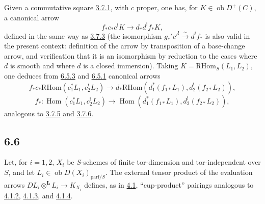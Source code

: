 \documentclass[11pt]{article}
\DeclareMathOperator{\Hom}{Hom}
\providecommand{\RHom}{\mathrm{RHom}}
\providecommand{\RHom}{\mathrm{RHom}}
\providecommand{\Hom}{\operatorname{Hom}}
\providecommand{\RHom}{\mathrm R\mathcal{H}om}
\providecommand{\RHom}{\mathrm{RHom}}
\providecommand{\Hom}{\operatorname{Hom}}
\begin{document}
Given a commutative square \hyperref[sga5:III:equation:3.7.1]{3.7.1}, with $c$ proper, one has, for $K\in\operatorname{ob}D^+(C)$, a canonical arrow
\begin{equation}
\tag{6.5.3}\label{sga5:III:equation:6.5.3}
f_*c_*c^!K\longrightarrow d_*d^!f_*K,
\end{equation}
defined in the same way as \hyperref[sga5:III:equation:3.7.3]{3.7.3} (the isomorphism $g_*'c'^!\xrightarrow{\sim}d^!f_*$ is also valid in the present context: definition of the arrow by transposition of a base-change arrow, and verification that it is an isomorphism by reduction to the cases where $d$ is smooth and where $d$ is a closed immersion). Taking $K=\RHom_S(L_1,L_2)$, one deduces from \hyperref[sga5:III:equation:6.5.3]{6.5.3} and \hyperref[sga5:III:equation:6.5.1]{6.5.1} canonical arrows
\begin{equation}
\tag{6.5.4}\label{sga5:III:equation:6.5.4}
f_*c_*\RHom(c_1^*L_1,c_2^!L_2)\longrightarrow d_*\RHom(d_1^*(f_{1*}L_1),d_2^!(f_{2*}L_2)),
\end{equation}
\begin{equation}
\tag{6.5.5}\label{sga5:III:equation:6.5.5}
f_*:\Hom(c_1^*L_1,c_2^!L_2)\longrightarrow\Hom(d_1^*(f_{1*}L_1),d_2^!(f_{2*}L_2)),
\end{equation}
analogous to \hyperref[sga5:III:equation:3.7.5]{3.7.5} and \hyperref[sga5:III:equation:3.7.6]{3.7.6}.

\subsection*{6.6}\label{sga5:III:subsection:6.6}
Let, for $i=1,2$, $X_i$ be $S$-schemes of finite tor-dimension and tor-independent over $S$, and let $L_i\in\operatorname{ob}D(X_i)_{\mathrm{parf}/S}$. The external tensor product of the evaluation arrows $DL_i\otimes^{\mathbf L}L_i\to K_{X_i}$ defines, as in \hyperref[sga5:III:subsection:4.1]{4.1}, ``cup-product'' pairings analogous to \hyperref[sga5:III:equation:4.1.2]{4.1.2}, \hyperref[sga5:III:equation:4.1.3]{4.1.3}, and \hyperref[sga5:III:equation:4.1.4]{4.1.4}.
\end{document}
